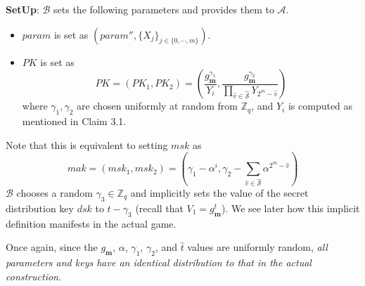 \noindent \textbf{SetUp}: $\mathcal{B}$ sets the following parameters and provides them to $\mathcal{A}$.
\begin{itemize}
  \item $param$ is set as $(param'',\{X_j\}_{j\in\{0,\cdots,m\}})\nonumber$.
  \item $PK$ is set as 
  \begin{equation}
   PK = (PK_1,PK_2) = \left(\frac{g^{\gamma_1}_{\mathbf{m}}}{Y_i},\frac{g^{\gamma_2}_{\mathbf{m}}}{\prod_{\hat{v}\in\hat{\mathcal{S}}}Y_{2^m-\hat{v}}}\right)\nonumber
  \end{equation}
  \noindent where $\gamma_1,\gamma_2$ are chosen uniformly at random from $\mathbb{Z}_q$, and $Y_i$ is computed as mentioned in Claim 3.1. 
   
\end{itemize}

\noindent Note that this is equivalent to setting $msk$ as
\begin{equation}
 mak = (msk_1,msk_2) = \left(\gamma_1-\alpha^i,\gamma_2-\sum_{\hat{v}\in\hat{\mathcal{S}}}\alpha^{2^m-\hat{v}}\right)\nonumber
\end{equation}
\noindent $\mathcal{B}$ chooses a random $\gamma_3\in\mathbb{Z}_q$ and implicitly sets the value of the secret distribution key $dsk$ to $t-\gamma_3$ (recall that $V_1=g^{t}_{\mathbf{m}}$). We see later how this implicit definition manifests in the actual game.

Once again, since the $g_{\mathbf{m}}$, $\alpha$, $\gamma_1$, $\gamma_2$, and $\hat{t}$ values are uniformly random, \emph{all parameters and keys have an identical distribution to that in the actual construction}.\\

